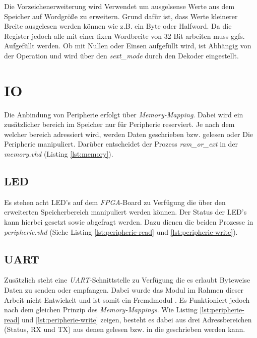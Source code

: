             Die Vorzeichenerweiterung wird Verwendet um ausgelsense Werte aus dem Speicher auf Wordgröße
            zu erweitern. Grund dafür ist, dass Werte kleinerer Breite ausgelesen werden können wie z.B. ein
            Byte oder Halfword. Da die Register jedoch alle mit einer fixen Wordbreite von 32 Bit arbeiten muss ggfs.
            Aufgefüllt werden. Ob mit Nullen oder Einsen aufgefüllt wird, ist Abhängig von der Operation und wird über den
            \textit{sext\_mode} durch den Dekoder eingestellt.
            
    \section{IO}

        Die Anbindung von Peripherie erfolgt über \textit{Memory-Mapping}.
        Dabei wird ein zusätzlicher bereich im Speicher nur für Peripherie reserviert.
        Je nach dem welcher bereich adressiert wird, werden Daten geschrieben bzw. gelesen
        oder Die Peripherie manipuliert. Darüber entscheidet der Prozess \textit{ram\_or\_ext}
        in der \textit{memory.vhd} (Listing \ref{lst:memory}).

        
        
        

        \subsection{LED}
            Es stehen acht LED's auf dem \textit{FPGA}-Board zu Verfügung die über den erweiterten Speicherbereich
            manipuliert werden können. Der Status der LED's kann hierbei gesetzt sowie abgefragt werden.
            Dazu dienen die beiden Prozesse in \textit{peripherie.vhd} (Siehe Listing \ref{lst:peripherie-read} und \ref{lst:peripherie-write}).

        \subsection{UART}
            Zusätzlich steht eine \textit{UART}-Schnittstelle zu Verfügung die es erlaubt Byteweise Daten
            zu senden oder empfangen.
            Dabei wurde das Modul im Rahmen dieser Arbeit nicht Entwickelt und ist somit ein Fremdmodul \cite{vhdl-uart}.
            Es Funktioniert jedoch nach dem gleichen Prinzip des \textit{Memory-Mappings}.
            Wie Listing \ref{lst:peripherie-read} und \ref{lst:peripherie-write} zeigen,
            besteht es dabei aus drei Adressbereichen (Status, RX und TX) aus denen gelesen bzw. in die geschrieben werden kann.
            

